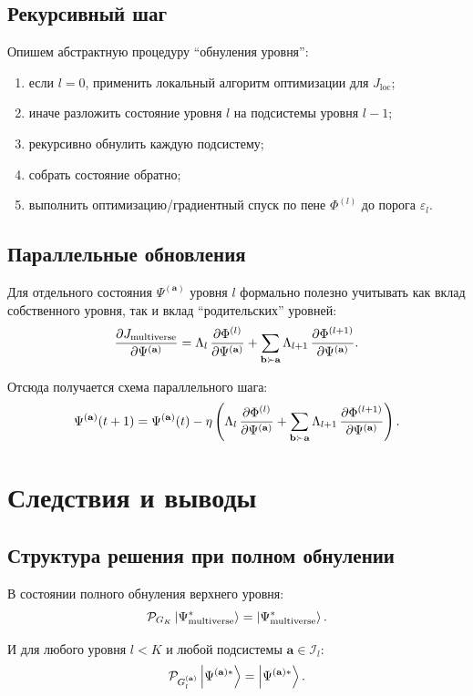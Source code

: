 \documentclass[11pt]{article}
\begin{document}
\subsection{Рекурсивный шаг}

Опишем абстрактную процедуру ``обнуления уровня'':
\begin{enumerate}[leftmargin=*, itemsep=4pt]
  \item если $l=0$, применить локальный алгоритм оптимизации для $J_{\text{loc}}$;
  \item иначе разложить состояние уровня $l$ на подсистемы уровня $l-1$;
  \item рекурсивно обнулить каждую подсистему;
  \item собрать состояние обратно;
  \item выполнить оптимизацию/градиентный спуск по пене $\Phi^{(l)}$ до порога $\varepsilon_l$.
\end{enumerate}

\subsection{Параллельные обновления}

Для отдельного состояния $\Psi^{(\mathbf{a})}$ уровня $l$ формально полезно учитывать как вклад собственного уровня, так и вклад ``родительских'' уровней:
\[
\pdv{J_{\text{multiverse}}}{\Psi^{(\mathbf{a})}}
= \Lambda_l\,\pdv{\Phi^{(l)}}{\Psi^{(\mathbf{a})}}
+ \sum_{\mathbf{b}\succ\mathbf{a}} \Lambda_{l+1}\,\pdv{\Phi^{(l+1)}}{\Psi^{(\mathbf{a})}}.
\]

Отсюда получается схема параллельного шага:
\[
\Psi^{(\mathbf{a})}(t+1)=\Psi^{(\mathbf{a})}(t)-\eta\left(
\Lambda_l\,\pdv{\Phi^{(l)}}{\Psi^{(\mathbf{a})}}
+ \sum_{\mathbf{b}\succ\mathbf{a}} \Lambda_{l+1}\,\pdv{\Phi^{(l+1)}}{\Psi^{(\mathbf{a})}}
\right).
\]

\section{Следствия и выводы}

\subsection{Структура решения при полном обнулении}

В состоянии полного обнуления верхнего уровня:
\[
\mathcal{P}_{G_K}\ket{\Psi_{\text{multiverse}}^*}=\ket{\Psi_{\text{multiverse}}^*}.
\]

И для любого уровня $l<K$ и любой подсистемы $\mathbf{a}\in\mathcal{I}_l$:
\[
\mathcal{P}_{G_l^{(\mathbf{a})}}\ket{\Psi^{(\mathbf{a})*}}=\ket{\Psi^{(\mathbf{a})*}}.
\]
\end{document}

